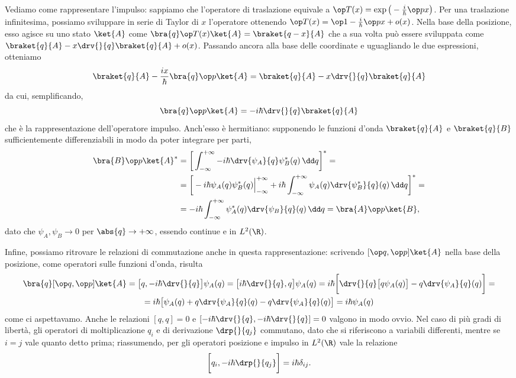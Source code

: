 Vediamo come rappresentare l'impulso: sappiamo che l'operatore di traslazione equivale a $\op T(x)=\exp\big(-\frac{i}{\hbar}\op px\big)$.
Per una traslazione infinitesima, possiamo sviluppare in serie di Taylor di $x$ l'operatore ottenendo $\op T(x)=\op 1-\frac{i}{\hbar}\op px+o(x)$.
Nella base della posizione, esso agisce su uno stato $\ket{A}$ come $\bra{q}\op T(x)\ket{A}=\braket{q-x}{A}$ che a sua volta può essere sviluppata come $\braket{q}{A}-x\drv{}{q}\braket{q}{A}+o(x)$.
Passando ancora alla base delle coordinate e uguagliando le due espressioni, otteniamo
\begin{equation}
	\braket{q}{A}-\frac{ix}{\hbar}\bra{q}\op p\ket{A}=\braket{q}{A}-x\drv{}{q}\braket{q}{A}
\end{equation}
da cui, semplificando,
\begin{equation}
	\bra{q}\op p\ket{A}=-i\hbar\drv{}{q}\braket{q}{A}
\end{equation}
che è la rappresentazione dell'operatore impulso.
Anch'esso è hermitiano: supponendo le funzioni d'onda $\braket{q}{A}$ e $\braket{q}{B}$ sufficientemente differenziabili in modo da poter integrare per parti,
\begin{equation}
	\begin{split}
		\bra{B}\op p\ket{A}^*&=\bigg[\int_{-\infty}^{+\infty}-i\hbar\drv{\psi_A}{q}\psi_B^*(q)\,\dd q\bigg]^*=\\
		&=\bigg[-i\hbar\psi_A(q)\psi_B^*(q)\Big|_{-\infty}^{+\infty}+i\hbar\int_{-\infty}^{+\infty}\psi_A(q)\drv{\psi_B^*}{q}(q)\,\dd q\bigg]^*=\\
		&=-i\hbar\int_{-\infty}^{+\infty}\psi_A^*(q)\drv{\psi_B}{q}(q)\,\dd q=\bra{A}\op p\ket{B},
	\end{split}
\end{equation}
dato che $\psi_A,\psi_B\to 0$ per $\abs{q}\to+\infty$, essendo continue e in $L^2(\R)$.

Infine, possiamo ritrovare le relazioni di commutazione anche in questa rappresentazione: scrivendo $[\op q,\op p]\ket{A}$ nella base della posizione, come operatori sulle funzioni d'onda, risulta
\begin{multline}
	\bra{q}[\op q,\op p]\ket{A}=\big[q,-i\hbar\drv{}{q}\big]\psi_A(q)=\big[i\hbar\drv{}{q},q\big]\psi_A(q)=i\hbar\bigg[\drv{}{q}\big[q\psi_A(q)\big]-q\drv{\psi_A}{q}(q)\bigg]=\\
	=i\hbar\big[\psi_A(q)+q\drv{\psi_A}{q}(q)-q\drv{\psi_A}{q}(q)\big]=i\hbar\psi_A(q)
\end{multline}
come ci aspettavamo.
Anche le relazioni $[q,q]=0$ e $[-i\hbar\drv{}{q},-i\hbar\drv{}{q}]=0$ valgono in modo ovvio.
Nel caso di più gradi di libertà, gli operatori di moltiplicazione $q_i$ e di derivazione $\drp{}{q_j}$ commutano, dato che si riferiscono a variabili differenti, mentre se $i=j$ vale quanto detto prima; riassumendo, per gli operatori posizione e impulso in $L^2(\R)$ vale la relazione
\begin{equation}
	\bigg[q_i,-i\hbar\drp{}{q_j}\bigg]=i\hbar\delta_{ij}.
	\label{eq:commutatori-fondamentali-L2}
\end{equation}

